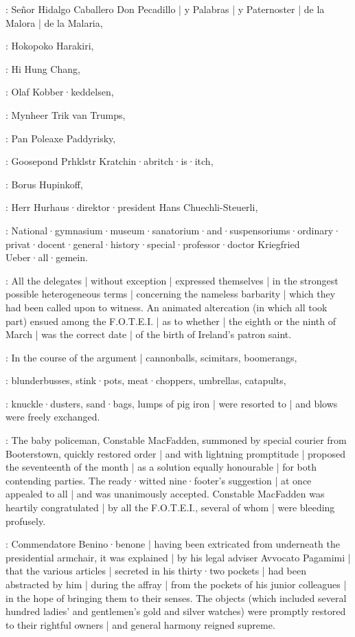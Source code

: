 :
Señor Hidalgo Caballero Don Pecadillo |
y Palabras |
y Paternoster |
de la Malora |
de la Malaria,

:
Hokopoko Harakiri,

:
Hi Hung Chang,

:
Olaf Kobber·keddelsen,

:
Mynheer Trik van Trumps,

:
Pan Poleaxe Paddyrisky,

:
Goosepond Prhklstr Kratchin·abritch·is·itch,

:
Borus Hupinkoff,

:
Herr Hurhaus·direktor·president Hans Chuechli-Steuerli,

:
National·gymnasium·museum·sanatorium·and·suspensoriums·ordinary·%
privat·docent·general·history·special·professor·doctor
Kriegfried Ueber·all·gemein.

:
All the delegates |
without exception |
expressed themselves |
in the strongest possible heterogeneous terms
 |
concerning the nameless barbarity |
which they had been called upon to witness.
An animated altercation
(in which all took part)
ensued among the F.O.T.E.I. |
as to whether |
the eighth or the ninth of March |
was the correct date |
of the birth of Ireland's patron saint.

:
In the course of the argument |
cannonballs,
scimitars,
boomerangs,

:
blunderbusses,
stink·pots,
meat·choppers,
umbrellas,
catapults,

:
knuckle·dusters,
sand·bags,
lumps of pig iron |
were resorted to |
and blows were freely exchanged.

:
The baby policeman,
Constable MacFadden,
summoned by special courier from Booterstown,
quickly restored order |
and with lightning promptitude |
proposed the seventeenth of the month
 |
as a solution equally honourable |
for both contending parties.
The ready·witted nine·footer's suggestion |
at once appealed to all |
and was unanimously accepted.
Constable MacFadden was heartily congratulated |
by all the F.O.T.E.I.,
several of whom |
were bleeding profusely.

:
Commendatore Benino·benone |
having been extricated from underneath the presidential armchair,
it was explained |
by his legal adviser Avvocato Pagamimi |
that the various articles |
secreted in his thirty·two pockets |
had been abstracted by him |
during the affray |
from the pockets of his junior colleagues |
in the hope of bringing them to their senses.
The objects
(which included several hundred ladies' and gentlemen's gold and silver watches)
were promptly restored to their rightful owners |
and general harmony reigned supreme.


